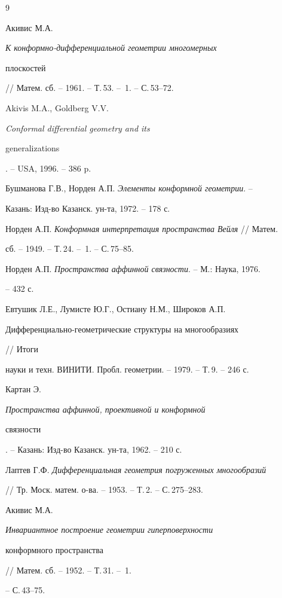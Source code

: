 \begin{thebibliography}{9} 


 




Акивис М.А. {\em К конформно-дифференциальной геометрии многомерных 


плоскостей} // Матем. сб. -- 1961. -- Т.\,53. -- \No\,1. -- С.\,53--72. 




Akivis M.A., Goldberg V.V. {\em Conformal differential geometry and its 


generalizations}. -- USA, 1996. -- 386 p. 




Бушманова Г.В., Норден А.П. {\em Элементы конформной геометрии}. -- 


Казань: Изд-во Казанск. ун-та, 1972. -- 178 с. 




Норден А.П. {\em Конформная интерпретация пространства Вейля} // Матем. 


сб. -- 1949. -- Т.\,24. -- \No\,1. -- С.\,75--85. 




Норден А.П. {\em Пространства аффинной связности}. -- М.: Наука, 1976. 


-- 432 с. 




Евтушик Л.Е., Лумисте Ю.Г., Остиану Н.М., Широков А.П. {\em 


Дифференциально-гео\-мет\-ри\-чес\-кие структуры на многообразиях} // Итоги 


науки и техн. ВИНИТИ. Пробл. геометрии. -- 1979. -- Т.\,9. -- 246 с. 




Картан Э. {\em Пространства аффинной, проективной и конформной 


связности}. -- Казань: Изд-во Казанск. ун-та, 1962. -- 210 с. 




Лаптев Г.Ф. {\em Дифференциальная геометрия погруженных многообразий} 


// Тр. Моск. матем. о-ва. -- 1953. -- Т.\,2. -- С.\,275--283. 




Акивис М.А. {\em Инвариантное построение геометрии гиперповерхности 


конформного пространства} // Матем. сб. -- 1952. -- Т.\,31. -- \No\,1. 


-- С.\,43--75. 


 


 


\end{thebibliography} 


 


\vskip 2cm 


 






 


\label{end} 


 


 


